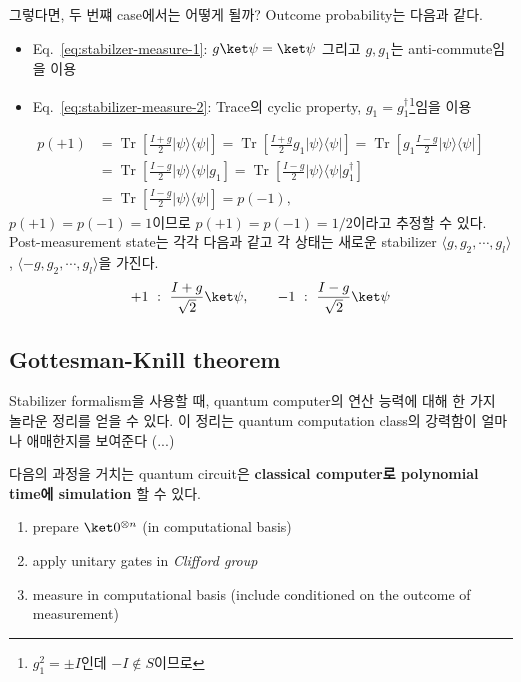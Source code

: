 그렇다면, 두 번쨰 case에서는 어떻게 될까? Outcome probability는 다음과 같다.
\begin{itemize}
    \item Eq.~\eqref{eq:stabilzer-measure-1}: $g\ket \psi = \ket \psi$ 그리고 $g, g_1$는 anti-commute임을 이용
    \item Eq.~\eqref{eq:stabilizer-measure-2}: Trace의 cyclic property, $g_1 = g_1^\dagger$\footnote{$g_1^2 = \pm I$인데 $-I \notin S$이므로}임을 이용
\end{itemize}
\begin{align}
    p(+1)&= \operatorname{Tr}\left[\frac{I+g}{2}|\psi\rangle\langle\psi|\right] = \operatorname{Tr}\left[\frac{I+g}{2} g_1|\psi\rangle\langle\psi|\right]=\operatorname{Tr}\left[g_1 \frac{I-g}{2}|\psi\rangle\langle\psi|\right] \label{eq:stabilzer-measure-1}\\
    &=\operatorname{Tr}\left[\frac{I-g}{2}|\psi\rangle\langle\psi| g_1\right] = \operatorname{Tr}\left[\frac{I-g}{2}|\psi\rangle\langle\psi| g_1^\dagger\right]\label{eq:stabilizer-measure-2}\\
    &=\operatorname{Tr}\left[\frac{I-g}{2}|\psi\rangle\langle\psi|\right]=p(-1),\label{eq:stabilizer-measure-3}
\end{align}
$p(+1) = p(-1) = 1$이므로 $p(+1) = p(-1) = 1/2$이라고 추정할 수 있다. Post-measurement state는 각각 다음과 같고 각 상태는 새로운 stabilizer $\langle g, g_2, \cdots, g_l \rangle$, $\langle -g, g_2, \cdots, g_l \rangle$을 가진다.
\begin{equation*}
    +1\ :\ \frac{I+g}{\sqrt 2}\ket \psi,\qquad -1\ :\ \frac{I-g}{\sqrt 2} \ket \psi
\end{equation*}


\subsection{Gottesman-Knill theorem}
Stabilizer formalism을 사용할 때, quantum computer의 연산 능력에 대해 한 가지 놀라운 정리를 얻을 수 있다. 이 정리는 quantum computation class의 강력함이 얼마나 애매한지를 보여준다 (...)
\begin{theorem}
    다음의 과정을 거치는 quantum circuit은 \textbf{classical computer로 polynomial time에 simulation} 할 수 있다.
    \begin{enumerate}
        \item prepare $\ket 0 ^{\otimes n}$ (in computational basis)
        \item apply unitary gates in \textit{Clifford group}
        \item measure in computational basis (include conditioned on the outcome of measurement)
    \end{enumerate}
\end{theorem}

